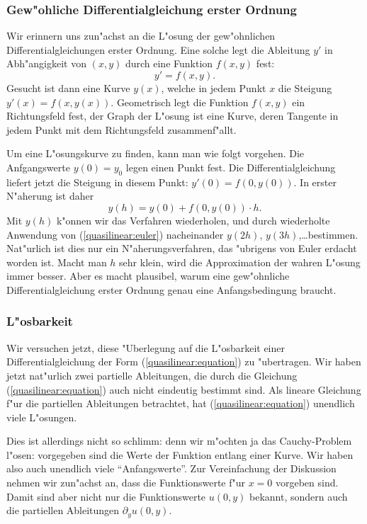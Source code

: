 \subsubsection{Gew"ohliche Differentialgleichung erster Ordnung}
Wir erinnern uns zun"achst an die L"osung der gew"ohnlichen
Differentialgleichungen erster Ordnung.
Eine solche legt die Ableitung $y'$ in Abh"angigkeit von 
$(x,y)$ durch eine Funktion $f(x,y)$ fest: 
\[
y'=f(x,y).
\]
Gesucht ist dann eine Kurve $y(x)$, welche
in jedem Punkt $x$ die Steigung $y'(x)=f(x,y(x))$.
Geometrisch legt die Funktion $f(x,y)$ ein Richtungsfeld fest,
der Graph der L"osung ist eine Kurve, deren Tangente in jedem
Punkt mit dem Richtungsfeld zusammenf"allt.

Um eine L"osungskurve zu finden, kann man wie folgt vorgehen.
Die Anfgangswerte  $y(0)=y_0$ legen einen Punkt fest.
Die Differentialgleichung liefert jetzt die Steigung in
diesem Punkt: $y'(0)=f(0,y(0))$.
In erster N"aherung ist daher
\begin{equation}
y(h)=y(0)+f(0,y(0))\cdot h.
\label{quasilinear:euler}
\end{equation}
Mit $y(h)$ k"onnen wir das Verfahren wiederholen, und durch
wiederholte Anwendung von (\ref{quasilinear:euler})
nacheinander $y(2h)$, $y(3h)$,\dots bestimmen.
Nat"urlich ist dies nur ein N"aherungsverfahren, das "ubrigens
von Euler erdacht worden ist. Macht man $h$ sehr klein, wird
die Approximation der wahren L"osung immer besser.
Aber es macht plausibel, warum eine gew"ohnliche Differentialgleichung
erster Ordnung genau eine Anfangsbedingung braucht.

\subsubsection{L"osbarkeit}
Wir versuchen jetzt, diese "Uberlegung auf die L"osbarkeit einer
Differentialgleichung der Form (\ref{quasilinear:equation}) zu 
"ubertragen. Wir haben jetzt nat"urlich zwei partielle Ableitungen, die
durch die Gleichung (\ref{quasilinear:equation}) auch nicht
eindeutig bestimmt sind. Als lineare Gleichung f"ur die partiellen
Ableitungen betrachtet, hat (\ref{quasilinear:equation}) unendlich 
viele L"osungen.

Dies ist allerdings nicht so schlimm: denn wir m"ochten ja das Cauchy-Problem
l"osen: vorgegeben sind die Werte der Funktion entlang einer Kurve.
Wir haben also auch unendlich viele ``Anfangswerte''.
Zur Vereinfachung der Diskussion nehmen wir zun"achst an, dass die
Funktionswerte f"ur $x=0$ vorgeben sind.
Damit sind aber nicht nur die Funktionswerte $u(0,y)$ bekannt, sondern
auch die partiellen Ableitungen $\partial_yu(0,y)$.

